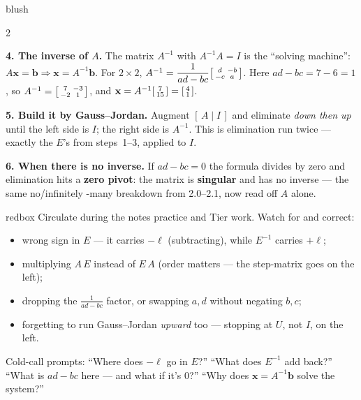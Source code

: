 \documentclass[10pt]{article}
\newcommand{\xx}{\mathbf{x}}
\newcommand{\bb}{\mathbf{b}}
\begin{document}
\begin{skillbox}[Lesson]{blush}
\begin{multicols}{2}
\columnbreak

\textbf{4. The inverse of $A$.} The matrix $A^{-1}$ with $A^{-1}A=I$ is the ``solving machine'':
$A\xx=\bb\Rightarrow\xx=A^{-1}\bb$. For $2\times2$, $A^{-1}=\dfrac{1}{ad-bc}\begin{bsmallmatrix} d&-b\\-c&a \end{bsmallmatrix}$.
Here $ad-bc=7-6=1$, so $A^{-1}=\begin{bsmallmatrix} 7&-3\\-2&1 \end{bsmallmatrix}$, and
$\xx=A^{-1}\begin{bsmallmatrix} 7\\15 \end{bsmallmatrix}=\begin{bsmallmatrix} 4\\1 \end{bsmallmatrix}$.

\textbf{5. Build it by Gauss--Jordan.} Augment $[\,A\mid I\,]$ and eliminate \emph{down then up}
until the left side is $I$; the right side is $A^{-1}$. This is elimination run twice --- exactly
the $E$'s from steps~1--3, applied to $I$.

\textbf{6. When there is no inverse.} If $ad-bc=0$ the formula divides by zero and elimination hits
a \textbf{zero pivot}: the matrix is \textbf{singular} and has no inverse --- the same no/infinitely
-many breakdown from 2.0--2.1, now read off $A$ alone.
\end{multicols}
\end{skillbox}

\begin{skillbox}{redbox}
Circulate during the notes practice and Tier work. Watch for and correct:
\begin{itemize}[leftmargin=1.2em, nosep]
  \item wrong sign in $E$ --- it carries $-\ell$ (subtracting), while $E^{-1}$ carries $+\ell$;
  \item multiplying $A\,E$ instead of $E\,A$ (order matters --- the step-matrix goes on the left);
  \item dropping the $\tfrac{1}{ad-bc}$ factor, or swapping $a,d$ without negating $b,c$;
  \item forgetting to run Gauss--Jordan \emph{upward} too --- stopping at $U$, not $I$, on the left.
\end{itemize}
Cold-call prompts: ``Where does $-\ell$ go in $E$?'' ``What does $E^{-1}$ add back?'' ``What is
$ad-bc$ here --- and what if it's $0$?'' ``Why does $\xx=A^{-1}\bb$ solve the system?''
\end{skillbox}
\end{document}
